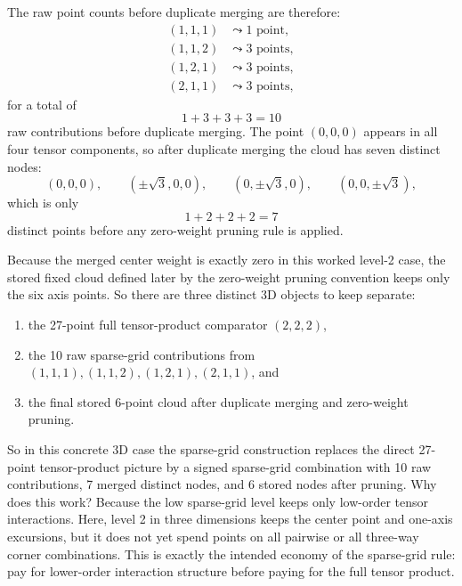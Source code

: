 \documentclass[11pt]{article}
\numberwithin{equation}{section}
\begin{document}
The raw point counts before duplicate merging are therefore:
\begin{align}
  (1,1,1) &\leadsto 1 \text{ point},
  \label{eq:p37-3d-count-111}\\
  (1,1,2) &\leadsto 3 \text{ points},
  \label{eq:p37-3d-count-112}\\
  (1,2,1) &\leadsto 3 \text{ points},
  \label{eq:p37-3d-count-121}\\
  (2,1,1) &\leadsto 3 \text{ points},
  \label{eq:p37-3d-count-211}
\end{align}
for a total of
\begin{equation}
  1+3+3+3=10
  \label{eq:p37-3d-raw-count}
\end{equation}
raw contributions before duplicate merging.  The point \((0,0,0)\) appears in
all four tensor components, so after duplicate merging the cloud has seven
distinct nodes:
\begin{equation}
  (0,0,0),
  \qquad
  (\pm\sqrt3,0,0),
  \qquad
  (0,\pm\sqrt3,0),
  \qquad
  (0,0,\pm\sqrt3),
  \label{eq:p37-3d-final-nodes}
\end{equation}
which is only
\begin{equation}
  1+2+2+2 = 7
  \label{eq:p37-3d-final-count}
\end{equation}
distinct points before any zero-weight pruning rule is applied.

Because the merged center weight is exactly zero in this worked level-2 case,
the stored fixed cloud defined later by the zero-weight pruning convention keeps
only the six axis points.  So there are three distinct 3D objects to keep
separate:
\begin{enumerate}[leftmargin=0.28in]
  \item the 27-point full tensor-product comparator \((2,2,2)\),
  \item the 10 raw sparse-grid contributions from
  \((1,1,1),(1,1,2),(1,2,1),(2,1,1)\), and
  \item the final stored 6-point cloud after duplicate merging and zero-weight
  pruning.
\end{enumerate}
So in this concrete 3D case the sparse-grid construction replaces the direct
27-point tensor-product picture by a signed sparse-grid combination with 10 raw
contributions, 7 merged distinct nodes, and 6 stored nodes after pruning.  Why
does this work?
Because the low sparse-grid level keeps only low-order tensor interactions.
Here, level 2 in three dimensions keeps the center point and one-axis excursions,
but it does not yet spend points on all pairwise or all three-way corner
combinations.  This is exactly the intended economy of the sparse-grid rule: pay
for lower-order interaction structure before paying for the full tensor product.
\end{document}
